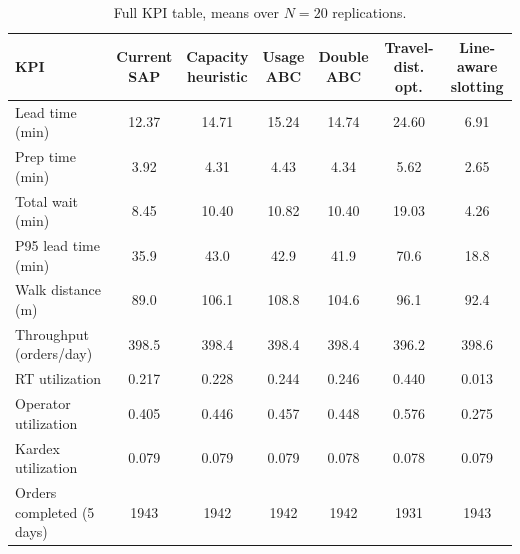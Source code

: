 \documentclass[conference]{IEEEtran}
\begin{document}
\begin{table}[htbp]
\centering
\caption{Full KPI table, means over $N=20$ replications.}
\label{tab:kpifull}
\scriptsize
\setlength{\tabcolsep}{3pt}
\begin{tabular}{l*{6}{c}}
\toprule
KPI & \makecell{Current\\SAP} & \makecell{Capacity\\heuristic} & \makecell{Usage\\ABC} & \makecell{Double\\ABC} & \makecell{Travel-dist.\\opt.} & \makecell{Line-aware\\slotting} \\
\midrule
Lead time (min) & 12.37 & 14.71 & 15.24 & 14.74 & 24.60 & 6.91 \\
Prep time (min) & 3.92 & 4.31 & 4.43 & 4.34 & 5.62 & 2.65 \\
Total wait (min) & 8.45 & 10.40 & 10.82 & 10.40 & 19.03 & 4.26 \\
P95 lead time (min) & 35.9 & 43.0 & 42.9 & 41.9 & 70.6 & 18.8 \\
Walk distance (m) & 89.0 & 106.1 & 108.8 & 104.6 & 96.1 & 92.4 \\
Throughput (orders/day) & 398.5 & 398.4 & 398.4 & 398.4 & 396.2 & 398.6 \\
RT utilization & 0.217 & 0.228 & 0.244 & 0.246 & 0.440 & 0.013 \\
Operator utilization & 0.405 & 0.446 & 0.457 & 0.448 & 0.576 & 0.275 \\
Kardex utilization & 0.079 & 0.079 & 0.079 & 0.078 & 0.078 & 0.079 \\
Orders completed (5 days) & 1943 & 1942 & 1942 & 1942 & 1931 & 1943 \\
\bottomrule
\end{tabular}
\end{table}
\end{document}

